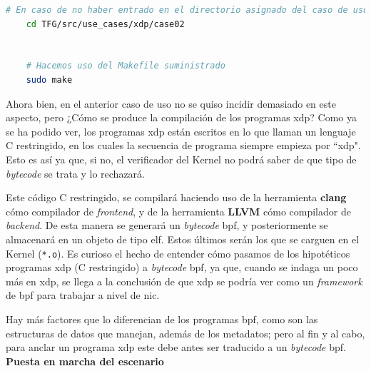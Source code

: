 \begin{lstlisting}[language= bash, style=Consola, caption={Compilación programa XDP - Case02},label=code:case02_xdp_ether_compilacion]
    # En caso de no haber entrado en el directorio asignado del caso de uso
    cd TFG/src/use_cases/xdp/case02
    
    
    # Hacemos uso del Makefile suministrado 
    sudo make
\end{lstlisting}
\vspace{0.5cm}

Ahora bien, en el anterior caso de uso no se quiso incidir demasiado en este aspecto, pero ¿Cómo se produce la compilación de los programas \gls{xdp}?  Como ya se ha podido ver, los programas \gls{xdp} están escritos en lo que llaman un lenguaje C restringido, en los cuales la secuencia de programa siempre empieza por ``xdp". Esto es así ya que, si no, el verificador del Kernel no podrá saber de que tipo de \textit{bytecode} se trata y lo rechazará.\\
\par

Este código C restringido, se compilará haciendo uso de la herramienta \textbf{clang} cómo compilador de \textit{frontend}, y de la herramienta \textbf{LLVM} cómo compilador de  \textit{backend}. De esta manera se generará un \textit{bytecode} \gls{bpf}, y posteriormente se almacenará en un objeto de tipo \gls{elf}. Estos últimos serán los que se carguen en el Kernel (\texttt{*.o}). Es curioso el hecho de entender cómo pasamos de los hipotéticos programas \gls{xdp} (C restringido) a \textit{bytecode} \gls{bpf}, ya que, cuando se indaga un poco más en \gls{xdp}, se llega a la conclusión de que \gls{xdp} se podría ver como un \textit{framework} de \gls{bpf} para trabajar a nivel de \gls{nic}.\\
\par
Hay más factores que lo diferencian de los programas \gls{bpf}, como son las estructuras de datos que manejan, además de los metadatos; pero al fin y al cabo, para anclar un programa \gls{xdp} este debe antes ser traducido a un \textit{bytecode} \gls{bpf}.\\

\vspace{0.7cm}
\textbf{Puesta en marcha del escenario}\\
\par

